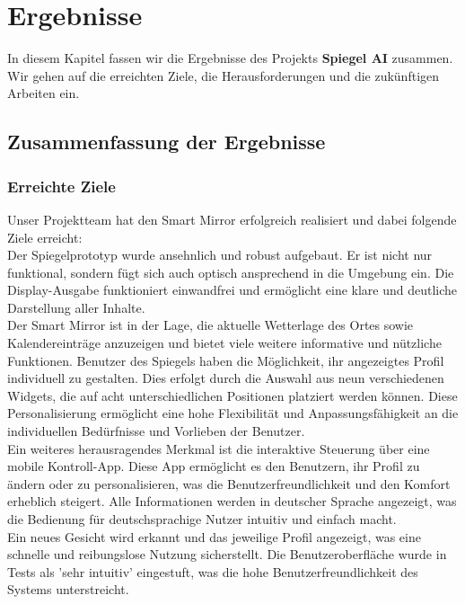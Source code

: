 \chapter{Ergebnisse}

In diesem Kapitel fassen wir die Ergebnisse des Projekts \textbf{Spiegel AI} zusammen. Wir gehen auf die erreichten Ziele, die Herausforderungen und die zukünftigen Arbeiten ein.

\section{Zusammenfassung der Ergebnisse}

\subsection{Erreichte Ziele}
Unser Projektteam hat den Smart Mirror erfolgreich realisiert und dabei folgende Ziele erreicht: \\

\noindent Der Spiegelprototyp wurde ansehnlich und robust aufgebaut. Er ist nicht nur funktional, sondern fügt sich auch optisch ansprechend in die Umgebung ein. Die Display-Ausgabe funktioniert einwandfrei und ermöglicht eine klare und deutliche Darstellung aller Inhalte. \\

\noindent Der Smart Mirror ist in der Lage, die aktuelle Wetterlage des Ortes sowie Kalendereinträge anzuzeigen und bietet viele weitere informative und nützliche Funktionen. Benutzer des Spiegels haben die Möglichkeit, ihr angezeigtes Profil individuell zu gestalten. Dies erfolgt durch die Auswahl aus neun verschiedenen Widgets, die auf acht unterschiedlichen Positionen platziert werden können. Diese Personalisierung ermöglicht eine hohe Flexibilität und Anpassungsfähigkeit an die individuellen Bedürfnisse und Vorlieben der Benutzer. \\

\noindent Ein weiteres herausragendes Merkmal ist die interaktive Steuerung über eine mobile Kontroll-App. Diese App ermöglicht es den Benutzern, ihr Profil zu ändern oder zu personalisieren, was die Benutzerfreundlichkeit und den Komfort erheblich steigert. Alle Informationen werden in deutscher Sprache angezeigt, was die Bedienung für deutschsprachige Nutzer intuitiv und einfach macht. \\

\noindent Ein neues Gesicht wird erkannt und das jeweilige Profil angezeigt, was eine schnelle und reibungslose Nutzung sicherstellt. Die Benutzeroberfläche wurde in Tests als 'sehr intuitiv' eingestuft, was die hohe Benutzerfreundlichkeit des Systems unterstreicht. \\

